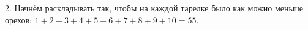 2. Начнём раскладывать так, чтобы на каждой тарелке было как можно меньше орехов: $1+2+3+4+5+6+7+8+9+10=55.$\\
